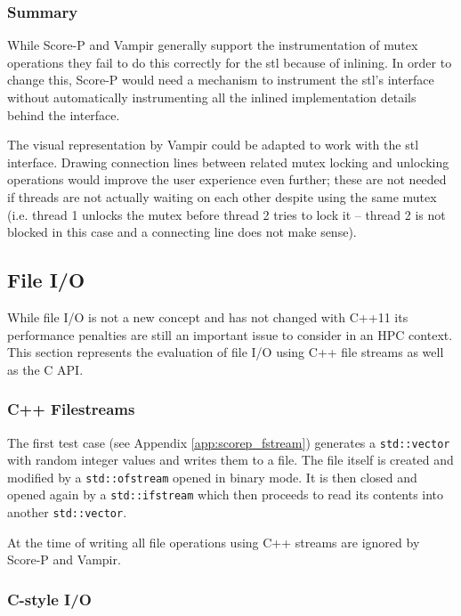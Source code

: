 \subsubsection{Summary}

While Score-P and Vampir generally support the instrumentation of mutex operations they fail to do this correctly for the \gls{stl} because of inlining. In order to change this, Score-P would need a mechanism to instrument the \gls{stl}'s interface without automatically instrumenting all the inlined implementation details behind the interface.

The visual representation by Vampir could be adapted to work with the \gls{stl} interface. Drawing connection lines between related mutex locking and unlocking operations would improve the user experience even further; these are not needed if threads are not actually waiting on each other despite using the same mutex (i.e. thread 1 unlocks the mutex before thread 2 tries to lock it -- thread 2 is not blocked in this case and a connecting line does not make sense).

\subsection{File I/O}

While file I/O is not a new concept and has not changed with C++11 its performance penalties are still an important issue to consider in an HPC context. This section represents the evaluation of file I/O using C++ file streams as well as the C API.

\subsubsection{C++ Filestreams}\label{scorep:fstream}

The first test case (see Appendix \ref{app:scorep_fstream}) generates a \texttt{std::vector} with random integer values and writes them to a file. The file itself is created and modified by a \texttt{std::ofstream} opened in binary mode. It is then closed and opened again by a \texttt{std::ifstream} which then proceeds to read its contents into another \texttt{std::vector}.

At the time of writing all file operations using C++ streams are ignored by Score-P and Vampir.

\subsubsection{C-style I/O}\label{scorep:c_io}

